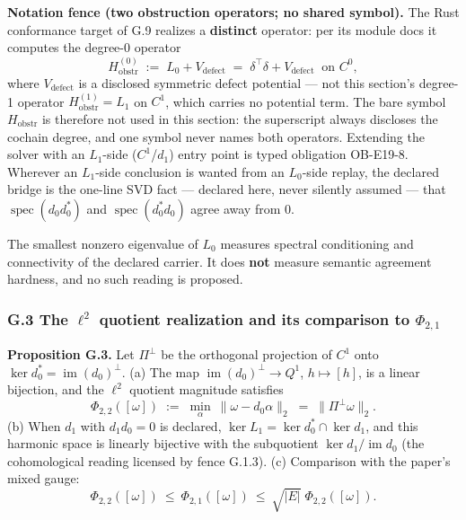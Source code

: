 \documentclass[
  11pt,
]{article}
\begin{document}
\textbf{Notation fence (two obstruction operators; no shared symbol).} The Rust conformance target of G.9 realizes a \textbf{distinct} operator: per its module docs it computes the degree-0 operator
\[H^{(0)}_{\mathrm{obstr}} \;:=\; L_0 + V_{\mathrm{defect}} \;=\; \delta^\top\delta + V_{\mathrm{defect}} \ \text{ on } C^0,\]
where \(V_{\mathrm{defect}}\) is a disclosed symmetric defect potential --- not this section's degree-1 operator \(H^{(1)}_{\mathrm{obstr}}=L_1\) on \(C^1\), which carries no potential term. The bare symbol \(H_{\mathrm{obstr}}\) is therefore not used in this section: the superscript always discloses the cochain degree, and one symbol never names both operators. Extending the solver with an \(L_1\)-side (\(C^1\)/\(d_1\)) entry point is typed obligation OB-E19-8. Wherever an \(L_1\)-side conclusion is wanted from an \(L_0\)-side replay, the declared bridge is the one-line SVD fact --- declared here, never silently assumed --- that \(\operatorname{spec}(d_0d_0^*)\) and \(\operatorname{spec}(d_0^*d_0)\) agree away from \(0\).

The smallest nonzero eigenvalue of \(L_0\) measures spectral conditioning and connectivity of the declared carrier. It does \textbf{not} measure semantic agreement hardness, and no such reading is proposed.

\subsubsection{\texorpdfstring{G.3 The \(\ell^2\) quotient realization and its comparison to \(\Phi_{2,1}\)}{G.3 The \textbackslash ell\^{}2 quotient realization and its comparison to \textbackslash Phi\_\{2,1\}}}\label{g.3-the-ell2-quotient-realization-and-its-comparison-to-phi_21}

\textbf{Proposition G.3.} Let \(\Pi^\perp\) be the orthogonal projection of \(C^1\) onto \(\ker d_0^*=\operatorname{im}(d_0)^\perp\).
(a) The map \(\operatorname{im}(d_0)^\perp\to Q^1\), \(h\mapsto[h]\), is a linear bijection, and the \(\ell^2\) quotient magnitude satisfies
\[\Phi_{2,2}([\omega]) \;:=\; \min_{\alpha}\ \|\omega-d_0\alpha\|_2 \;=\; \|\Pi^\perp\omega\|_2 .\]
(b) When \(d_1\) with \(d_1d_0=0\) is declared, \(\ker L_1=\ker d_0^*\cap\ker d_1\), and this harmonic space is linearly bijective with the subquotient \(\ker d_1/\operatorname{im} d_0\) (the cohomological reading licensed by fence G.1.3).
(c) Comparison with the paper's mixed gauge:
\[\Phi_{2,2}([\omega])\ \le\ \Phi_{2,1}([\omega])\ \le\ \sqrt{|E|}\;\Phi_{2,2}([\omega]).\]
\end{document}
